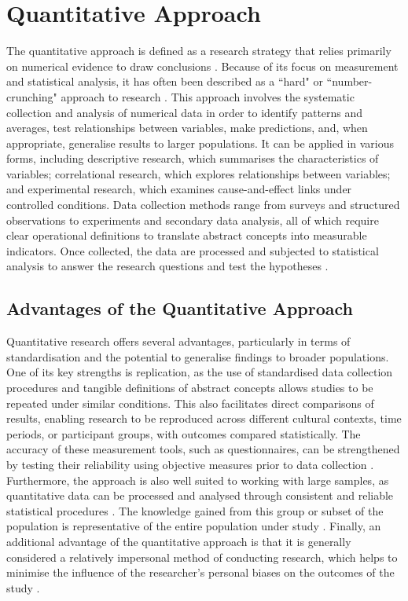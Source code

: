 \documentclass[a4paper, 12pt, twoside]{report}  %
\begin{document}
\section{Quantitative Approach}

\indent The quantitative approach is defined as a research strategy that relies primarily on numerical evidence to draw conclusions \cite{veal}. Because of its focus on measurement and statistical analysis, it has often been described as a ``hard" or ``number-crunching" approach to research \cite{murphyblack}. This approach involves the systematic collection and analysis of numerical data in order to identify patterns and averages, test relationships between variables, make predictions, and, when appropriate, generalise results to larger populations. It can be applied in various forms, including descriptive research, which summarises the characteristics of variables; correlational research, which explores relationships between variables; and experimental research, which examines cause-and-effect links under controlled conditions. Data collection methods range from surveys and structured observations to experiments and secondary data analysis, all of which require clear operational definitions to translate abstract concepts into measurable indicators. Once collected, the data are processed and subjected to statistical analysis to answer the research questions and test the hypotheses \cite{scribbrquant}.

\subsection{Advantages of the Quantitative Approach}

\indent Quantitative research offers several advantages, particularly in terms of standardisation and the potential to generalise findings to broader populations. One of its key strengths is replication, as the use of standardised data collection procedures and tangible definitions of abstract concepts allows studies to be repeated under similar conditions. This also facilitates direct comparisons of results, enabling research to be reproduced across different cultural contexts, time periods, or participant groups, with outcomes compared statistically. The accuracy of these measurement tools, such as questionnaires, can be strengthened by testing their reliability using objective measures prior to data collection \cite{neuman}. Furthermore, the approach is also well suited to working with large samples, as quantitative data can be processed and analysed through consistent and reliable statistical procedures \cite{scribbrquant}. The knowledge gained from this group or subset of the population is representative of the entire population under study \cite{bernard}. Finally, an additional advantage of the quantitative approach is that it is generally considered a relatively impersonal method of conducting research, which helps to minimise the influence of the researcher’s personal biases on the outcomes of the study \cite{cooper}.
\end{document}
